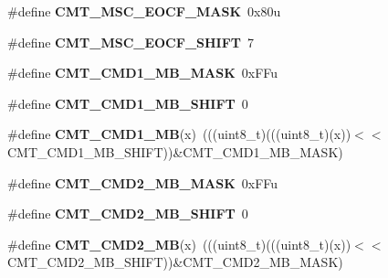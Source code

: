 \begin{DoxyCompactItemize}
\item 
\#define {\bfseries C\+M\+T\+\_\+\+M\+S\+C\+\_\+\+E\+O\+C\+F\+\_\+\+M\+A\+SK}~0x80u\hypertarget{group__CMT__Register__Masks_ga1aec1fa9b79d496b3f5f32fab07495a3}{}\label{group__CMT__Register__Masks_ga1aec1fa9b79d496b3f5f32fab07495a3}

\item 
\#define {\bfseries C\+M\+T\+\_\+\+M\+S\+C\+\_\+\+E\+O\+C\+F\+\_\+\+S\+H\+I\+FT}~7\hypertarget{group__CMT__Register__Masks_gab505074d349c8d2c800e554a0893f312}{}\label{group__CMT__Register__Masks_gab505074d349c8d2c800e554a0893f312}

\item 
\#define {\bfseries C\+M\+T\+\_\+\+C\+M\+D1\+\_\+\+M\+B\+\_\+\+M\+A\+SK}~0x\+F\+Fu\hypertarget{group__CMT__Register__Masks_gae4b77d2880f04b69d33cacfe3978042a}{}\label{group__CMT__Register__Masks_gae4b77d2880f04b69d33cacfe3978042a}

\item 
\#define {\bfseries C\+M\+T\+\_\+\+C\+M\+D1\+\_\+\+M\+B\+\_\+\+S\+H\+I\+FT}~0\hypertarget{group__CMT__Register__Masks_ga8bbdd2644bc864f959170f9260981476}{}\label{group__CMT__Register__Masks_ga8bbdd2644bc864f959170f9260981476}

\item 
\#define {\bfseries C\+M\+T\+\_\+\+C\+M\+D1\+\_\+\+MB}(x)~(((uint8\+\_\+t)(((uint8\+\_\+t)(x))$<$$<$C\+M\+T\+\_\+\+C\+M\+D1\+\_\+\+M\+B\+\_\+\+S\+H\+I\+FT))\&C\+M\+T\+\_\+\+C\+M\+D1\+\_\+\+M\+B\+\_\+\+M\+A\+SK)\hypertarget{group__CMT__Register__Masks_gae3e2ac370668a3642cce5a73276c84c8}{}\label{group__CMT__Register__Masks_gae3e2ac370668a3642cce5a73276c84c8}

\item 
\#define {\bfseries C\+M\+T\+\_\+\+C\+M\+D2\+\_\+\+M\+B\+\_\+\+M\+A\+SK}~0x\+F\+Fu\hypertarget{group__CMT__Register__Masks_gac9616164033684cd0d73e63eb6381441}{}\label{group__CMT__Register__Masks_gac9616164033684cd0d73e63eb6381441}

\item 
\#define {\bfseries C\+M\+T\+\_\+\+C\+M\+D2\+\_\+\+M\+B\+\_\+\+S\+H\+I\+FT}~0\hypertarget{group__CMT__Register__Masks_gaeff28d00f2825fc455b2f37c218ce24f}{}\label{group__CMT__Register__Masks_gaeff28d00f2825fc455b2f37c218ce24f}

\item 
\#define {\bfseries C\+M\+T\+\_\+\+C\+M\+D2\+\_\+\+MB}(x)~(((uint8\+\_\+t)(((uint8\+\_\+t)(x))$<$$<$C\+M\+T\+\_\+\+C\+M\+D2\+\_\+\+M\+B\+\_\+\+S\+H\+I\+FT))\&C\+M\+T\+\_\+\+C\+M\+D2\+\_\+\+M\+B\+\_\+\+M\+A\+SK)\hypertarget{group__CMT__Register__Masks_ga87471234abbe07360747af94e8ac2bf0}{}\label{group__CMT__Register__Masks_ga87471234abbe07360747af94e8ac2bf0}


\end{DoxyCompactItemize}
